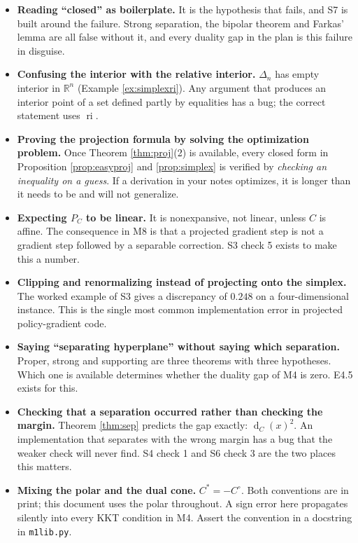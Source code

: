 \documentclass[11pt,a4paper]{article}
\theoremstyle{definition}
\theoremstyle{plain}
\theoremstyle{remark}
\newcommand{\R}{\mathbb{R}}
\newcommand{\proj}{P}
\DeclareMathOperator{\ri}{ri}
\DeclareMathOperator{\dist}{d}
\newcommand{\Simplex}{\Delta}
\begin{document}
\begin{itemize}
\item \textbf{Reading ``closed'' as boilerplate.} It is the hypothesis that fails, and S7 is
built around the failure. Strong separation, the bipolar theorem and Farkas' lemma are all false
without it, and every duality gap in the plan is this failure in disguise.

\item \textbf{Confusing the interior with the relative interior.} $\Simplex_n$ has empty
interior in $\R^n$ (Example \ref{ex:simplexri}). Any argument that produces an interior point of
a set defined partly by equalities has a bug; the correct statement uses $\ri$.

\item \textbf{Proving the projection formula by solving the optimization problem.} Once Theorem
\ref{thm:proj}(2) is available, every closed form in Proposition \ref{prop:easyproj} and
\ref{prop:simplex} is verified by \emph{checking an inequality on a guess}. If a derivation in
your notes optimizes, it is longer than it needs to be and will not generalize.

\item \textbf{Expecting $\proj_C$ to be linear.} It is nonexpansive, not linear, unless $C$ is
affine. The consequence in M8 is that a projected gradient step is not a gradient step followed
by a separable correction. S3 check 5 exists to make this a number.

\item \textbf{Clipping and renormalizing instead of projecting onto the simplex.} The worked
example of S3 gives a discrepancy of $0.248$ on a four-dimensional instance. This is the single
most common implementation error in projected policy-gradient code.

\item \textbf{Saying ``separating hyperplane'' without saying which separation.} Proper, strong
and supporting are three theorems with three hypotheses. Which one is available determines
whether the duality gap of M4 is zero. E4.5 exists for this.

\item \textbf{Checking that a separation occurred rather than checking the margin.} Theorem
\ref{thm:sep} predicts the gap exactly: $\dist_C(x)^2$. An implementation that separates with
the wrong margin has a bug that the weaker check will never find. S4 check 1 and S6 check 3 are
the two places this matters.

\item \textbf{Mixing the polar and the dual cone.} $C^*=-C^\circ$. Both conventions are in
print; this document uses the polar throughout. A sign error here propagates silently into every
KKT condition in M4. Assert the convention in a docstring in \texttt{m1lib.py}.


\end{itemize}
\end{document}
